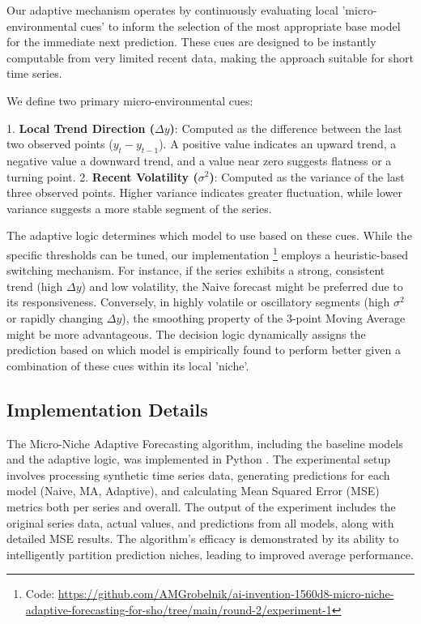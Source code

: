 \documentclass[11pt,letterpaper]{article}
\begin{document}
Our adaptive mechanism operates by continuously evaluating local 'micro-environmental cues' to inform the selection of the most appropriate base model for the immediate next prediction. These cues are designed to be instantly computable from very limited recent data, making the approach suitable for short time series.

We define two primary micro-environmental cues:

1.  \textbf{Local Trend Direction (\texorpdfstring{$\Delta y$}{Delta y})}: Computed as the difference between the last two observed points ($y_t - y_{t-1}$). A positive value indicates an upward trend, a negative value a downward trend, and a value near zero suggests flatness or a turning point.
2.  \textbf{Recent Volatility (\texorpdfstring{$\sigma^2$}{sigma squared})}: Computed as the variance of the last three observed points. Higher variance indicates greater fluctuation, while lower variance suggests a more stable segment of the series.

The adaptive logic determines which model to use based on these cues. While the specific thresholds can be tuned, our implementation \footnote{Code: \url{https://github.com/AMGrobelnik/ai-invention-1560d8-micro-niche-adaptive-forecasting-for-sho/tree/main/round-2/experiment-1}} employs a heuristic-based switching mechanism. For instance, if the series exhibits a strong, consistent trend (high \texorpdfstring{$\Delta y$}{Delta y}) and low volatility, the Naive forecast might be preferred due to its responsiveness. Conversely, in highly volatile or oscillatory segments (high \texorpdfstring{$\sigma^2$}{sigma squared} or rapidly changing \texorpdfstring{$\Delta y$}{Delta y}), the smoothing property of the 3-point Moving Average might be more advantageous. The decision logic dynamically assigns the prediction based on which model is empirically found to perform better given a combination of these cues within its local 'niche'.

\subsection{Implementation Details}

The Micro-Niche Adaptive Forecasting algorithm, including the baseline models and the adaptive logic, was implemented in Python . The experimental setup involves processing synthetic time series data, generating predictions for each model (Naive, MA, Adaptive), and calculating Mean Squared Error (MSE) metrics both per series and overall. The output of the experiment includes the original series data, actual values, and predictions from all models, along with detailed MSE results. The algorithm's efficacy is demonstrated by its ability to intelligently partition prediction niches, leading to improved average performance.
\end{document}
